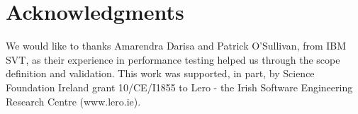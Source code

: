 \documentclass[runningheads,a4paper]{llncs}
\begin{document}
\section*{Acknowledgments}
\vspace{-7pt}
We would like to thanks Amarendra Darisa and Patrick O'Sullivan, from IBM SVT,
as their experience in performance testing helped us through the scope
definition and validation. This work was supported, in part, by Science
Foundation Ireland grant 10/CE/I1855 to Lero - the Irish Software Engineering
Research Centre (www.lero.ie).

\vspace{-8pt}



\end{document}

